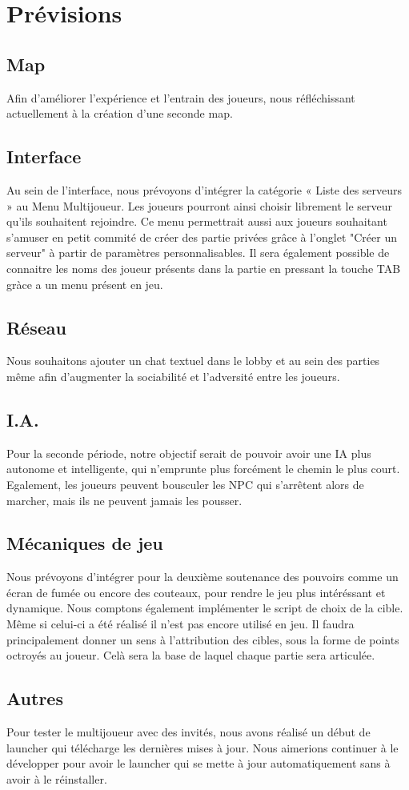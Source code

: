 \section{Prévisions}

\subsection{Map}
    Afin d'améliorer l'expérience et l'entrain des joueurs, nous réfléchissant actuellement à la création d'une seconde map.

\subsection{Interface}
    Au sein de l’interface, nous prévoyons d’intégrer la catégorie « Liste des serveurs » au Menu Multijoueur. 
    Les joueurs pourront ainsi choisir librement le serveur qu’ils souhaitent rejoindre. 
    Ce menu permettrait aussi aux joueurs souhaitant s'amuser en petit commité de créer des 
    partie privées grâce à l'onglet "Créer un serveur" à partir de paramètres personnalisables. 
    Il sera également possible de connaitre les noms des joueur présents dans la partie en pressant la touche TAB gràce a un menu présent en jeu.

\subsection{Réseau}
    Nous souhaitons ajouter un chat textuel dans le lobby et au sein des parties même afin d’augmenter la sociabilité et l’adversité entre les joueurs.

\subsection{I.A.}
    Pour la seconde période, notre objectif serait de pouvoir avoir une IA plus autonome et intelligente, qui n'emprunte plus forcément le chemin le plus court.
    Egalement, les joueurs peuvent bousculer les NPC qui s'arrêtent alors de marcher, mais ils ne peuvent jamais les pousser.

\subsection{Mécaniques de jeu}
    Nous prévoyons d'intégrer pour la deuxième soutenance des pouvoirs
    comme un écran de fumée ou encore des couteaux,
    pour rendre le jeu plus intéréssant et dynamique.
    Nous comptons également implémenter le script de choix de la cible. Même si celui-ci a été réalisé il n'est pas encore utilisé en jeu. Il faudra principalement donner un sens à l'attribution des cibles, sous la forme de points octroyés au joueur. Celà sera la base de laquel chaque partie sera articulée.

\subsection{Autres}
    Pour tester le multijoueur avec des invités, nous avons réalisé 
    un début de launcher qui télécharge les dernières mises à jour.
    Nous aimerions continuer à le développer pour avoir le launcher
    qui se mette à jour automatiquement sans à avoir à le réinstaller.
